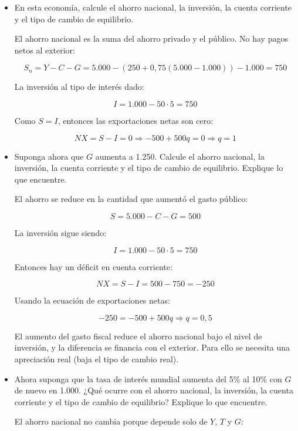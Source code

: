 \documentclass[a4paper]{article}
\begin{document}
\begin{itemize}
    \item[a)] En esta economía, calcule el ahorro nacional, la inversión, la cuenta corriente y el tipo de cambio de equilibrio.
    \begin{solution}
        El ahorro nacional es la suma del ahorro privado y el público. No hay pagos netos al exterior:

        \[
        S_n = Y - C - G = 5.000 - (250 + 0{,}75(5.000 - 1.000)) - 1.000 = 750
        \]

        La inversión al tipo de interés dado:

        \[
        I = 1.000 - 50 \cdot 5 = 750
        \]

        Como \( S = I \), entonces las exportaciones netas son cero:

        \[
        NX = S - I = 0 \Rightarrow -500 + 500q = 0 \Rightarrow q = 1
        \]
    \end{solution}

    \item[b)] Suponga ahora que $G$ aumenta a 1.250. Calcule el ahorro nacional, la inversión, la cuenta corriente y el tipo de cambio de equilibrio. Explique lo que encuentre.
    \begin{solution}
        El ahorro se reduce en la cantidad que aumentó el gasto público:

        \[
        S = 5.000 - C - G = 500
        \]

        La inversión sigue siendo:

        \[
        I = 1.000 - 50 \cdot 5 = 750
        \]

        Entonces hay un déficit en cuenta corriente:

        \[
        NX = S - I = 500 - 750 = -250
        \]

        Usando la ecuación de exportaciones netas:

        \[
        -250 = -500 + 500q \Rightarrow q = 0{,}5
        \]

        El aumento del gasto fiscal reduce el ahorro nacional bajo el nivel de inversión, y la diferencia se financia con el exterior. Para ello se necesita una apreciación real (baja el tipo de cambio real).
    \end{solution}

    \item[c)] Ahora suponga que la tasa de interés mundial aumenta del 5\% al 10\% con $G$ de nuevo en 1.000. ¿Qué ocurre con el ahorro nacional, la inversión, la cuenta corriente y el tipo de cambio de equilibrio? Explique lo que encuentre.
    \begin{solution}
        El ahorro nacional no cambia porque depende solo de $Y$, $T$ y $G$:


\end{solution}
\end{itemize}
\end{document}

